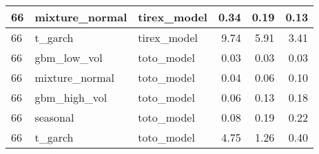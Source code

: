 {\begin{tabular}{lllrrr}
\midrule
66 & mixture\_normal & tirex\_model & 0.34 & 0.19 & 0.13 \\
\midrule
66 & t\_garch & tirex\_model & 9.74 & 5.91 & 3.41 \\
\midrule
66 & gbm\_low\_vol & toto\_model & 0.03 & 0.03 & 0.03 \\
\midrule
66 & mixture\_normal & toto\_model & 0.04 & 0.06 & 0.10 \\
\midrule
66 & gbm\_high\_vol & toto\_model & 0.06 & 0.13 & 0.18 \\
\midrule
66 & seasonal & toto\_model & 0.08 & 0.19 & 0.22 \\
\midrule
66 & t\_garch & toto\_model & 4.75 & 1.26 & 0.40 \\
\bottomrule
\end{tabular}
}
